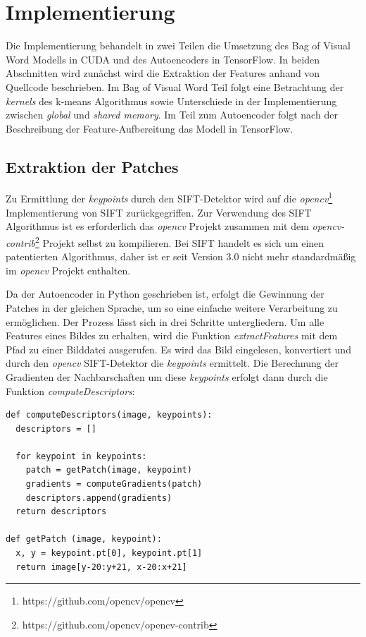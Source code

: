 \chapter{Implementierung}

Die Implementierung behandelt in zwei Teilen die Umsetzung des Bag of Visual Word Modells in CUDA und des Autoencoders in TensorFlow. In beiden Abschnitten wird zunächst wird die Extraktion der Features anhand von Quellcode beschrieben. Im Bag of Visual Word Teil folgt eine Betrachtung der \textit{kernels} des k-means Algorithmus sowie Unterschiede in der Implementierung zwischen \textit{global} und \textit{shared memory}. Im Teil zum Autoencoder folgt nach der Beschreibung der Feature-Aufbereitung das Modell in TensorFlow.


\section{Extraktion der Patches}

Zu Ermittlung der \textit{keypoints} durch den SIFT-Detektor wird auf die \textit{opencv}\footnote{https://github.com/opencv/opencv} Implementierung von SIFT zurückgegriffen. Zur Verwendung des SIFT Algorithmus ist es erforderlich das \textit{opencv} Projekt zusammen mit dem \textit{opencv-contrib}\footnote{https://github.com/opencv/opencv-contrib} Projekt selbst zu kompilieren. Bei SIFT handelt es sich um einen patentierten Algorithmus, daher ist er seit Version 3.0 nicht mehr standardmäßig im \textit{opencv} Projekt enthalten.

Da der Autoencoder in Python geschrieben ist, erfolgt die Gewinnung der Patches in der gleichen Sprache, um so eine einfache weitere Verarbeitung zu ermöglichen. Der Prozess lässt sich in drei Schritte untergliedern. Um alle Features eines Bildes zu erhalten, wird die Funktion \textit{extractFeatures} mit dem Pfad zu einer Bilddatei ausgerufen. Es wird das Bild eingelesen, konvertiert und durch den \textit{opencv} SIFT-Detektor die \textit{keypoints} ermittelt. Die Berechnung der Gradienten der Nachbarschaften um diese \textit{keypoints} erfolgt dann durch die Funktion \textit{computeDescriptors}:

\lstset{language=Python}
\begin{lstlisting}
def computeDescriptors(image, keypoints):
  descriptors = []
  
  for keypoint in keypoints:
  	patch = getPatch(image, keypoint)
  	gradients = computeGradients(patch)
  	descriptors.append(gradients)
  return descriptors
  
def getPatch (image, keypoint):
  x, y = keypoint.pt[0], keypoint.pt[1]
  return image[y-20:y+21, x-20:x+21]
\end{lstlisting}

